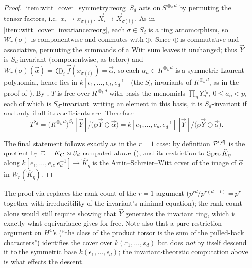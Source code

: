 \begin{proof}
    \ref{item:witt_cover_symmetry:reorg} $S_d$ acts on $S^{\otimes_k d}$ by permuting the
    tensor factors, i.e.\ $x_i \mapsto x_{\sigma(i)}$,
    $\vec X_i \mapsto \vec X_{\sigma(i)}$. As in
    \ref{item:witt_cover_invariance:reorg}, each $\sigma \in S_d$ is a ring automorphism,
    so $W_r(\sigma)$ is componentwise and commutes with $\oplus$. Since $\oplus$ is
    commutative and associative, permuting the summands of a Witt sum leaves it
    unchanged; thus $\vec Y$ is $S_d$-invariant (componentwise, as before) and
    $W_r(\sigma)(\vec \alpha) = \bigoplus_i \vec f(x_{\sigma(i)}) = \vec \alpha$, so
    each $\alpha_n \in R^{\otimes_k d}$ is a symmetric Laurent polynomial, hence lies
    in $k[e_1, \dots, e_d, e_d^{-1}]$ (the $S_d$-invariants of $R^{\otimes_k d}$, as
    in the proof of ). By
    , $T$ is free over $R^{\otimes_k d}$ with basis the
    monomials $\prod_n Y_n^{a_n}$, $0 \leq a_n < p$, each of which is
    $S_d$-invariant; writing an element in this basis, it is $S_d$-invariant if and
    only if all its coefficients are. Therefore
    \[
    T^{S_d} = \bigl(R^{\otimes_k d}\bigr)^{S_d}[\vec Y]\big/\bigl(\wp \vec Y \ominus \vec \alpha\bigr)
    = k[e_1, \dots, e_d, e_d^{-1}][\vec Y]\big/\bigl(\wp \vec Y \ominus \vec \alpha\bigr).
    \]

    The final statement follows exactly as in the $r=1$ case: by definition
    $\mathcal{P}'^{[d]}$ is the quotient by $\Xi = K_{G} \rtimes S_d$ computed above
    (), and its restriction to $\operatorname{Spec} \widehat K_\eta$
    along $k[e_1, \dots, e_d, e_d^{-1}] \to \widehat K_\eta$ is the
    Artin--Schreier--Witt cover of the image of $\vec \alpha$ in
    $W_r(\widehat K_\eta)$.
\end{proof}

\begin{rem*}
    The proof via  replaces the rank count of the
    $r=1$ argument ($p^{rd}/p^{r(d-1)} = p^r$ together with irreducibility of the
    invariant's minimal equation); the rank count alone would still require showing
    that $\vec Y$ generates the invariant ring, which is exactly what equivariance
    gives for free. Note also that a pure restriction argument on $H^1$'s (``the
    class of the product torsor is the sum of the pulled-back characters'')
    identifies the cover over $k(x_1, \dots, x_d)$ but does \emph{not} by itself
    descend it to the symmetric base $k(e_1, \dots, e_d)$; the invariant-theoretic
    computation above is what effects the descent.
\end{rem*}

